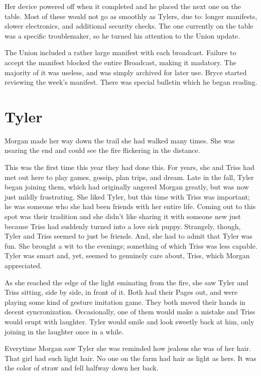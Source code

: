 \documentclass[courier]{sffms}
\begin{document}
Her device powered off when it completed and he placed
the next one on the table. Most of these would not
go as smoothly as Tylers, due to: longer manifests,
slower electronics, and additional security checks.
The one currently on the table was a specific
troublemaker, so he turned his attention to the
Union update.

The Union included a rather large manifest with
each broadcast. Failure to accept the manifest blocked
the entire Broadcast, making it madatory. The
majority of it was useless, and was simply archived 
for later use. Bryce started reviewing the week's
manifest. There was special bulletin which he began
reading.

\chapter{Tyler}
Morgan made her way down the trail she had walked many
times. She was nearing the end and could see the fire
flickering in the distance.

This was the first time this year they had done this.
For years, she and Triss had met out here to play
games, gossip, plan trips, and dream. Late in the fall,
Tyler began joining them, which had originally angered
Morgan greatly, but was now just mildly frustrating.
She liked Tyler, but this time with Triss was important;
he was someone who she had been friends with her entire
life. Coming out to this spot was their tradition
and she didn't like sharing it with someone new
just because Triss had suddenly turned into a love sick
puppy. Strangely, though, Tyler and Triss seemed
to just be friends. And, she had to admit that
Tyler was fun. She brought a wit to the evenings; something of
which Triss was less capable. Tyler was
smart and, yet, seemed to genuinely care about,
Triss, which Morgan appreciated.

As she reached the edge of the light eminating from
the fire, she saw Tyler and Triss sitting, side by side,
in front of it. Both had their Pages out, and were
playing some kind of gesture imitation game. They
both moved their hands in decent syncronization.
Occasionally, one of them would make a mistake
and Triss would erupt with laughter. Tyler would
smile and look sweetly back at him, only
joining in the laughter once in a while.

Everytime Morgan saw Tyler she was reminded how
jealous she was of her hair. That girl had such light
hair. No one on the farm had hair as light as hers.
It was the color of straw and fell halfway down her
back.
\end{document}
